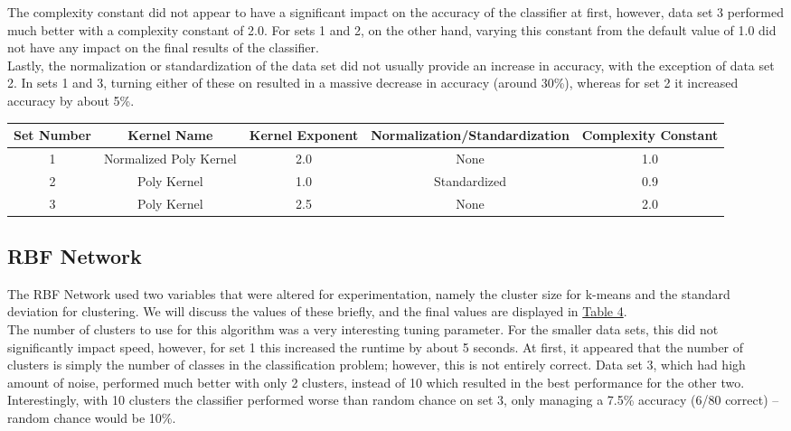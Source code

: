 \documentclass{article}
\begin{document}
		The complexity constant did not appear to have a significant impact on the accuracy of the classifier at first, however, data set 3 performed much better with a complexity constant of 2.0. For sets 1 and 2, on the other hand, varying this constant from the default value of 1.0 did not have any impact on the final results of the classifier. \\
		
		Lastly, the normalization or standardization of the data set did not usually provide an increase in accuracy, with the exception of data set 2. In sets 1 and 3, turning either of these on resulted in a massive decrease in accuracy (around 30\%), whereas for set 2 it increased accuracy by about 5\%. \\

	
	\begin{minipage}{\linewidth}
		\centering
		\begin{tabular}{c|cccc}\label{SVM_In}
			Set Number 	& Kernel Name & Kernel Exponent	& Normalization/Standardization & Complexity Constant  \\
			\hline
			1					&  Normalized Poly Kernel & 2.0 &	None						& 1.0	  \\
			2					&  Poly Kernel & 1.0 					& Standardized		 	  & 0.9		\\ 
			3					&  Poly Kernel & 2.5					& None						  & 2.0		\\
		\end{tabular}
	\end{minipage}

	\subsection{RBF Network}
		The RBF Network used two variables that were altered for experimentation, namely the cluster size for k-means and the standard deviation for clustering. We will discuss the values of these briefly, and the final values are displayed in \hyperref[RBF_In]{Table 4}. \\

		The number of clusters to use for this algorithm was a very interesting tuning parameter. For the smaller data sets, this did not significantly impact speed, however, for set 1 this increased the runtime by about 5 seconds. At first, it appeared that the number of clusters is simply the number of classes in the classification problem; however, this is not entirely correct. Data set 3, which had high amount of noise, performed much better with only 2 clusters, instead of 10 which resulted in the best performance for the other two. Interestingly, with 10 clusters the classifier performed worse than random chance on set 3, only managing a 7.5\% accuracy (6/80 correct) -- random chance would be 10\%. \\
		
\end{document}

